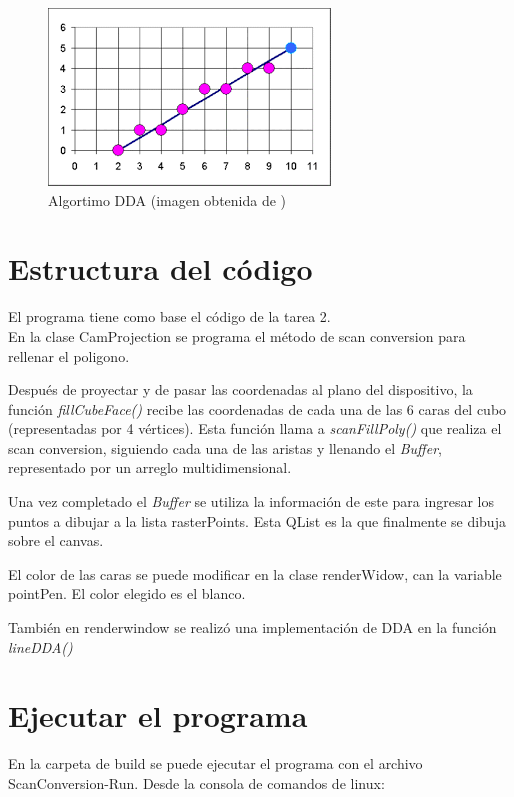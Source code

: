 \documentclass[12pt]{article}
\begin{document}
\begin{figure}[H]
\centering
\includegraphics[scale=0.5]{images/DDA.png}
\caption{Algortimo DDA (imagen obtenida de \cite{dda})}
\end{figure}


  
\section{Estructura del código}

El programa tiene como base el código de la tarea 2.\\

En la clase CamProjection se programa el método de scan conversion para rellenar el poligono.

Después de proyectar y de pasar las coordenadas al plano del dispositivo, la función \textit{fillCubeFace()} recibe las coordenadas de cada una de las 6 caras del cubo (representadas por 4 vértices). Esta función llama a \textit{scanFillPoly()} que realiza el scan conversion, siguiendo cada una de las aristas y llenando el \textit{Buffer}, representado por un arreglo multidimensional.


Una vez completado el \textit{Buffer} se utiliza la información de este para ingresar los puntos a dibujar a la lista rasterPoints. Esta QList es la que finalmente se dibuja sobre el canvas.

El color de las caras se puede modificar en la clase renderWidow, can la variable pointPen. El color elegido es el blanco.

También en renderwindow se realizó una implementación de DDA en la función \textit{lineDDA()}

\section{Ejecutar el programa}
En la carpeta de build se puede ejecutar el programa con el archivo ScanConversion-Run. Desde la consola de comandos de linux:
\end{document}
